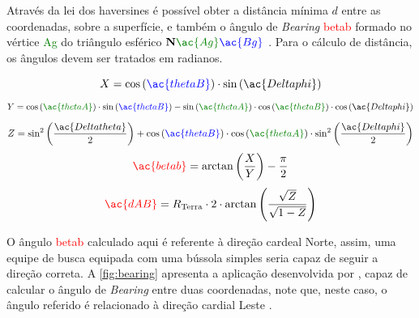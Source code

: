 Através da lei dos haversines é possível obter a distância mínima $d$ entre as coordenadas, sobre a superfície, e também o ângulo de \textit{Bearing} \textcolor{Red}{\ac{betab}} formado no vértice \textcolor{Green}{\ac{Ag}} do triângulo esférico $\mathbf{N}\textcolor{Green}{\ac{Ag}}\textcolor{Blue}{\ac{Bg}}$ \cite{chrisveness}.
Para o cálculo de distância, os ângulos devem ser tratados em radianos.

\begin{equation}
    X = \cos\left(\textcolor{Blue}{\ac{thetaB}}\right)\cdot \sin\left(\ac{Deltaphi}\right)
\end{equation}
\begin{equation}
    Y = \cos\left(\textcolor{Green}{\ac{thetaA}}\right)\cdot\sin\left(\textcolor{Blue}{\ac{thetaB}}\right) - \sin\left(\textcolor{Green}{\ac{thetaA}}\right) \cdot \cos\left(\textcolor{Green}{\ac{thetaB}}\right) \cdot \cos\left(\ac{Deltaphi}\right)
\end{equation}
\begin{equation}
    Z = \sin^2\left(\frac{\ac{Deltatheta}}{2}\right) + \cos\left(\textcolor{Blue}{\ac{thetaB}}\right) \cdot \cos\left(\textcolor{Green}{\ac{thetaA}}\right) \cdot \sin^2\left(\frac{\ac{Deltaphi}}{2}\right)
\end{equation}
\begin{equation}
    \textcolor{Red}{\ac{betab}} = \arctan\left(\frac{X}{Y}\right) - \frac{\pi}{2}
\end{equation}
\begin{equation}
    \textcolor{Red}{\ac{dAB}} = R_\text{Terra} \cdot 2 \cdot \arctan\left(\frac{\sqrt{Z}}{\sqrt{1-Z}}\right)
\end{equation}

O ângulo \textcolor{Red}{\ac{betab}} calculado aqui é referente à direção cardeal Norte, assim, uma equipe de busca equipada com uma bússola simples seria capaz de seguir a direção correta.
A \autoref{fig:bearing} apresenta a aplicação desenvolvida por \citeauthor{chrisveness}, capaz de calcular o ângulo de \textit{Bearing} entre duas coordenadas, note que, neste caso, o ângulo referido é relacionado à direção cardial Leste \cite{chrisveness}.

